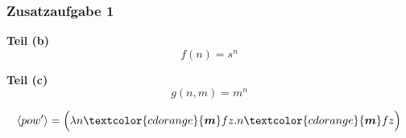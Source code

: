 \documentclass{beamer}
\newcommand{\colll}[1]{\textcolor{cdorange}{\boldsymbol{#1}}}
\newcommand{\num}[1]{\ensuremath{\langle #1 \rangle}}
\begin{document}
%
\begin{frame} \frametitle{Zusatzaufgabe 1}
	\textbf{Teil (b)} 
	\begin{equation*} 
		f(n) = s^n 
	\end{equation*}
	
	\bigskip
	
	\textbf{Teil (c)}
	\begin{equation*} 
		g(n,m) = m^n 
	\end{equation*}
	
	\begin{equation*} 
		\num{pow'} = \Bigl( \lambda n \colll{m} f z . n \colll{m} f z \Big) 
	\end{equation*}
\end{frame}
\end{document}

